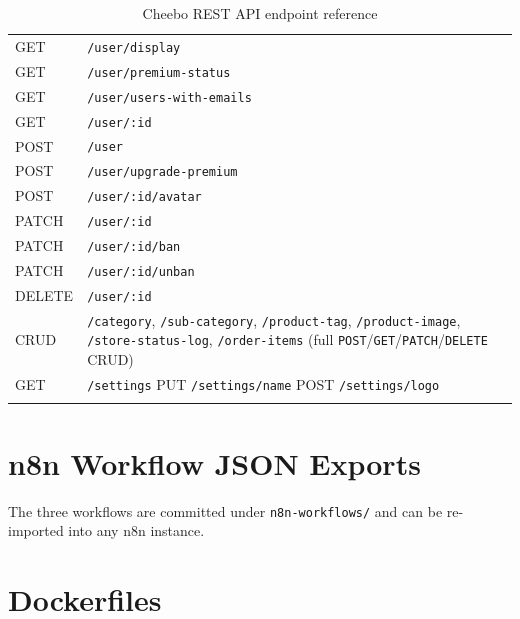 \documentclass[12pt, a4paper, oneside]{report}
\begin{document}
\begin{longtable}{|>{\raggedright\arraybackslash}p{1.8cm}|>{\raggedright\arraybackslash}p{11cm}|}
GET & \texttt{/user/display} \\
GET & \texttt{/user/premium-status} \\
GET & \texttt{/user/users-with-emails} \\
GET & \texttt{/user/:id} \\
POST & \texttt{/user} \\
POST & \texttt{/user/upgrade-premium} \\
POST & \texttt{/user/:id/avatar} \\
PATCH & \texttt{/user/:id} \\
PATCH & \texttt{/user/:id/ban} \\
PATCH & \texttt{/user/:id/unban} \\
DELETE & \texttt{/user/:id} \\
\hline
CRUD & \texttt{/category}, \texttt{/sub-category}, \texttt{/product-tag}, \texttt{/product-image}, \texttt{/store-status-log}, \texttt{/order-items} (full \texttt{POST}/\texttt{GET}/\texttt{PATCH}/\texttt{DELETE} CRUD) \\
\hline
GET & \texttt{/settings} \quad PUT \texttt{/settings/name} \quad POST \texttt{/settings/logo} \\
\hline
\caption{Cheebo REST API endpoint reference}
\label{tab:api-endpoints}
\end{longtable}
\normalsize

\chapter{n8n Workflow JSON Exports}
\label{app:n8n-workflows}

The three workflows are committed under \texttt{n8n-workflows/} and can
be re-imported into any n8n instance.







\chapter{Dockerfiles}
\label{app:dockerfiles}
\end{document}
